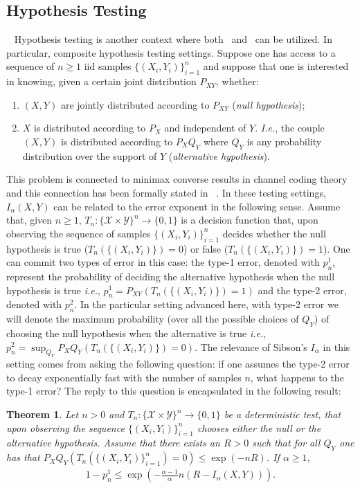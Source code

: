 \documentclass{article}
\newtheorem{theorem}{Theorem}
\numberwithin{theorem}{section}
\numberwithin{example}{section}
\numberwithin{remark}{section}
\numberwithin{definition}{section}
\newcommand{\X}{\mathcal{X}}
\newcommand{\Y}{\mathcal{Y}}
\newcommand{\revised}[1]{{\color{black} #1}}
\begin{document}
\subsection{Hypothesis Testing}~\label{sec:hypothesisTesting}
Hypothesis testing is another context where both~ and~ can be  utilized. In particular, composite hypothesis testing settings. Suppose one has access to a sequence of $n\geq 1$ iid samples $\{(X_i,Y_i)\}_{i=1}^n$ and suppose that one is interested in knowing, given a certain joint distribution $P_{XY}$, whether:
\begin{enumerate}
    \item $(X,Y)$ are jointly distributed according to $P_{XY}$ (\emph{null hypothesis});
    \item \revised{$X$ is distributed according to $P_X$ and independent of $Y$. \textit{I.e.}, the couple $(X,Y)$ is distributed according to $P_XQ_Y$ where $Q_Y$ is any probability distribution over the support of $Y$ (\emph{alternative hypothesis})}.
\end{enumerate}
\revised{This problem is connected to minimax converse results in channel coding theory and this connection has been formally stated in ~\cite[Section II]{Polyanskiy:13}.}
In these testing settings, $I_\alpha(X,Y)$ can be related to the error exponent in the following sense. Assume that, given $n\geq 1$, $T_n :\{ \mathcal{X}\times\mathcal{Y}\}^n\to\{0,1\}$ is a decision function that, upon observing the sequence of samples  $\{(X_i,Y_i)\}_{i=1}^n$ decides whether the null hypothesis is true ($T_n(\{(X_i,Y_i)\})=0$) or false ($T_n(\{(X_i,Y_i)\})=1$). One can commit two types of error in this case: the type-1 error, denoted with $p_n^1$, represent the probability of deciding the alternative hypothesis when the null hypothesis is true \textit{i.e.}, $p_n^1 = P_{XY}(T_n(\{(X_i,Y_i)\})=1)$ and the type-2 error, denoted with $p_n^2$. In the particular setting advanced here, with type-2 error we will denote the maximum probability (over all the possible choices of $Q_Y$) of choosing the null hypothesis when the alternative is true \textit{i.e.}, $p_n^2 = \sup_{Q_Y} P_XQ_Y(T_n(\{(X_i,Y_i)\})=0).$ The relevance of Sibson's $I_\alpha$ in this setting comes from asking the following question: if one assumes the type-2 error to decay exponentially fast with the number of samples $n$, what happens to the type-1 error? The reply to this question is encapsulated in the following result:
\begin{theorem}\label{thm:hypTesting}
    Let $n>0$ and $T_n : \{\X\times\Y\}^n \to \{0,1\}$ be a deterministic test, that upon observing the sequence $\{(X_i,Y_i)\}_{i=1}^n$ chooses either the null or the alternative hypothesis.
 Assume that there exists an $ R>0$ such that for all  $Q_Y$ one has that $ P_XQ_Y(T_n(\{(X_i,Y_i)\}_{i=1}^n) = 0) \leq \exp(-nR)$. If $\alpha\geq1$,
 \begin{align}
     1- p^1_n \leq \exp\left(-\frac{\alpha-1}{\alpha}n(R-I_\alpha(X,Y))\right).\label{eq:iAlphaHypothesisTesting}
 \end{align}
\end{theorem}
\end{document}
